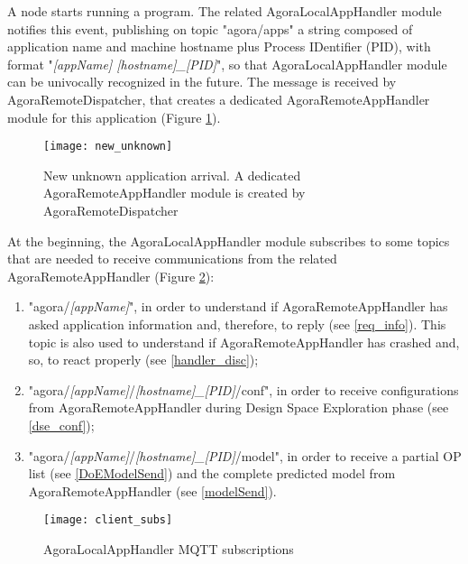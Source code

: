 A node starts running a program. The related AgoraLocalAppHandler module notifies this event, publishing on topic "agora\slash{}apps" a string composed of application name and machine hostname plus Process IDentifier (PID), with format "\textit{[appName] [hostname]\_[PID]}", so that AgoraLocalAppHandler module can be univocally recognized in the future. The message is received by Agora\-Remote\-Dispatcher, that creates a dedicated AgoraRemoteAppHandler module for this application (Figure \ref{fig::unk}).

\begin{figure}[hb]

    \centering
    \texttt{[image: new\_unknown]}
    \caption[New unknown application arrival]{New unknown application arrival. A dedicated AgoraRemoteAppHandler module is created by AgoraRemoteDispatcher}

    \label{fig::unk}
    
\end{figure}

At the beginning, the Agora\-Local\-App\-Handler module subscribes to some topics that are needed to receive communications from the related Agora\-Remote\-App\-Handler (Figure \ref{fig::localSubs}):

\begin{enumerate}

    \item "agora/\textit{[appName]}", in order to understand if AgoraRemoteAppHandler has asked application information and, therefore, to reply (see \ref{req_info}). This topic is also used to understand if Agora\-Remote\-App\-Handler has crashed and, so, to react properly (see \ref{handler_disc});
    
    \item "agora/\textit{[appName]}/\textit{[hostname]\_[PID]}/conf", in order to receive configurations from AgoraRemoteAppHandler during Design Space Exploration phase (see \ref{dse_conf});
    
    \item "agora/\textit{[appName]}/\textit{[hostname]\_[PID]}/model", in order to receive a partial OP list (see \ref{DoEModelSend}) and the complete predicted model from AgoraRemoteAppHandler (see \ref{modelSend}).

\end{enumerate}

\begin{figure}[t]

    \centering
    \texttt{[image: client\_subs]}
    \caption{AgoraLocalAppHandler MQTT subscriptions}

    \label{fig::localSubs}
    
\end{figure}

